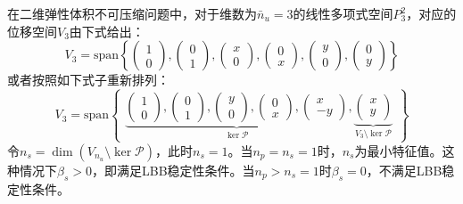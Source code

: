 在二维弹性体积不可压缩问题中，对于维数为$\bar{n}_u=3$的线性多项式空间$P^2_3$，对应的位移空间$V_3$由下式给出：
\begin{equation}
    V_3 = \mathrm{span} \left \{
    \begin{pmatrix} 1 \\ 0 \end{pmatrix},
    \begin{pmatrix} 0 \\ 1 \end{pmatrix},
    \begin{pmatrix} x \\ 0 \end{pmatrix},
    \begin{pmatrix} 0 \\ x \end{pmatrix},
    \begin{pmatrix} y \\ 0 \end{pmatrix},
    \begin{pmatrix} 0 \\ y \end{pmatrix}
    \right \}
\end{equation}
或者按照如下式子重新排列：
\begin{equation}\label{ch_3:eq:base1}
    V_3 = \mathrm{span} 
    \begin{Bmatrix}
        \underbrace{
        \begin{pmatrix} 1 \\ 0 \end{pmatrix},
        \begin{pmatrix} 0 \\ 1 \end{pmatrix},
        \begin{pmatrix} y \\ 0 \end{pmatrix},
        \begin{pmatrix} 0 \\ x \end{pmatrix},
        \begin{pmatrix} x \\ -y \end{pmatrix}
        }_{\ker \mathcal P},
        \underbrace{
        \begin{pmatrix} x \\ y \end{pmatrix}
        }_{V_3\setminus \ker \mathcal P}
    \end{Bmatrix}
\end{equation}
令$n_s = \dim(V_{n_u}\setminus \ker \mathcal P)$，此时$n_s=1$。当$n_p=n_s=1$时，$n_s$为最小特征值。这种情况下$\beta_s>0$，即满足LBB稳定性条件。当$n_p>n_s=1$时$\beta_s=0$，不满足LBB稳定性条件。

